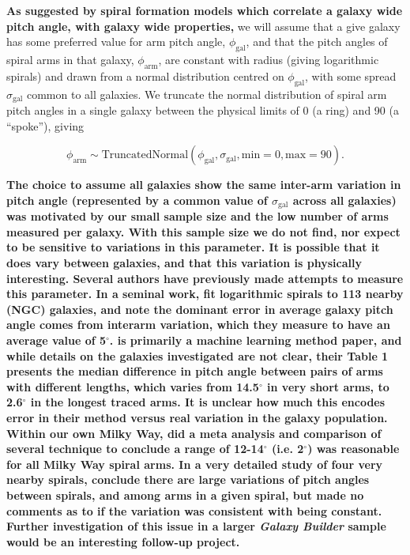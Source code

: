 \textbf{As suggested by spiral formation models which correlate a galaxy wide pitch angle, with galaxy wide properties,} we will assume that a give galaxy has some preferred value for arm pitch angle, $\phi_\mathrm{gal}$, and that the pitch angles of spiral arms in that galaxy, $\phi_\mathrm{arm}$, are constant with radius (giving logarithmic spirals) and drawn from a normal distribution centred on $\phi_\mathrm{gal}$, with some spread $\sigma_\mathrm{gal}$ common to all galaxies. We truncate the normal distribution of spiral arm pitch angles in a single galaxy between the physical limits of {0\degree} (a ring) and {90\degree} (a ``spoke''), giving

\begin{equation}
\phi_\mathrm{arm} \sim \mathrm{TruncatedNormal}(\phi_\mathrm{gal}, \sigma_\mathrm{gal}, \mathrm{min}=0, \mathrm{max}=90).
\end{equation}

\textbf{The choice to assume all galaxies show the same inter-arm variation in pitch angle (represented by a common value of $\sigma_\mathrm{gal}$ across all galaxies) was motivated by our small sample size and the low number of arms measured per galaxy. With this sample size we do not find, nor expect to be sensitive to variations in this parameter. It is possible that it does vary between galaxies, and that this variation is physically interesting. Several authors have previously made attempts to measure this parameter.  In a seminal work, \citet{1981AJ.....86.1847K} fit logarithmic spirals to 113 nearby (NGC) galaxies, and note the dominant error in average galaxy pitch angle comes from interarm variation, which they measure to have an average value of 5$^\circ$. \citet{2014ApJ...790...87D} is primarily a machine learning method paper, and while details on the galaxies investigated are not clear, their Table 1 presents the median difference in pitch angle between pairs of arms with different lengths, which varies from 14.5$^\circ$ in very short arms, to 2.6$^\circ$ in the longest traced arms. It is unclear how much this encodes error in their method versus real variation in the galaxy population. Within our own Milky Way, \citet{Vallee2015} did a meta analysis and comparison of several technique to conclude a range of 12-14$^\circ$ (i.e. 2$^\circ$) was reasonable for all Milky Way spiral arms. In a very detailed study of four very nearby spirals, \citet{HonigRead2015} conclude there are large variations of pitch angles  between spirals, and among arms in a given spiral, but made no comments as to if the variation was consistent with being constant. Further investigation of this issue in a larger \textit{Galaxy Builder} sample would be an interesting follow-up project.}

